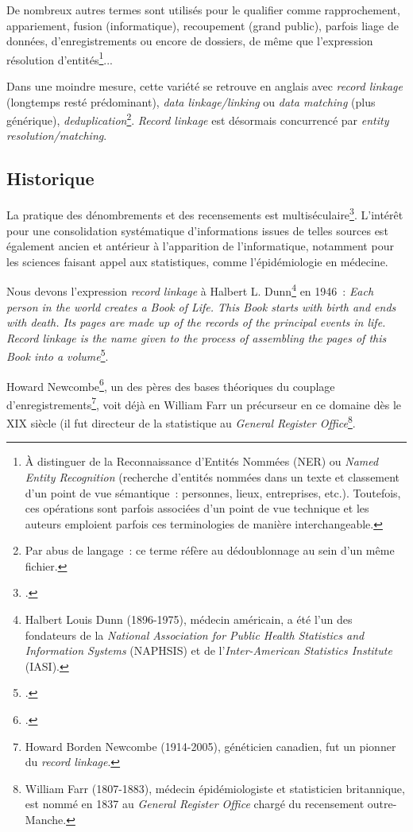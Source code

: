 \documentclass[a4paper,12pt,twoside]{book}
\newcommand{\siecle}[1]{\textsc{#1}\ieme}
\begin{document}
		        De nombreux autres termes sont utilisés pour le qualifier comme rapprochement, appariement, fusion (informatique), recoupement (grand public), parfois liage de données, d'enregistrements ou encore de dossiers, de même que l'expression résolution d'entités\footnote{À distinguer de la Reconnaissance d'Entités Nommées (NER) ou \textit{Named Entity Recognition} (recherche d'entités nommées dans un texte et classement d'un point de vue sémantique~: personnes, lieux, entreprises, etc.). Toutefois, ces opérations sont parfois associées d'un point de vue technique et les auteurs emploient parfois ces terminologies de manière interchangeable.}...
		    
		        Dans une moindre mesure, cette variété se retrouve en anglais avec \textit{record linkage} (longtemps resté prédominant), \textit{data linkage/linking} ou \textit{data matching} (plus générique), \textit{deduplication}\footnote{Par abus de langage~: ce terme réfère au dédoublonnage au sein d'un même fichier.}. \textit{Record linkage} est désormais concurrencé par \textit{entity resolution/matching}.
		    
			\subsection{Historique}
			\label{historl}
			    La pratique des dénombrements et des recensements est multiséculaire\footcite{dupaquierHistoireDemographie1985}. L'intérêt pour une consolidation systématique d'informations issues de telles sources est également ancien et antérieur à l'apparition de l'informatique, notamment pour les sciences faisant appel aux statistiques, comme l'épidémiologie en médecine.
			    
			    Nous devons l'expression \textit{record linkage} à Halbert L. Dunn\footnote{Halbert Louis Dunn (1896-1975), médecin américain, a été l'un des fondateurs de la \textit{National Association for Public Health Statistics and Information Systems} (NAPHSIS) et de l'\textit{Inter-American Statistics Institute} (IASI).} en 1946~:
			    \og{}\textit{Each person in the world creates a Book of Life. This Book starts with birth and ends with death. Its pages are made up of the records of the principal events in life. Record linkage is the name given to the process of assembling the pages of this Book into a volume}\fg{}\footcite{dunnRecordLinkage1946}.
			    
			    Howard Newcombe\footcite{newcombeCouplageDonneesPour1969}, un des pères des bases théoriques du couplage d'enregistrements\footnote{Howard Borden Newcombe (1914-2005), généticien canadien, fut un pionner du \textit{record linkage}.}, voit déjà en William Farr un précurseur en ce domaine dès le \siecle{XIX} siècle (il fut directeur de la statistique au \textit{General Register Office}\footnote{William Farr (1807-1883), médecin épidémiologiste et statisticien britannique, est nommé en 1837 au \textit{General Register Office} chargé du recensement outre-Manche.}.
			    
\end{document}
